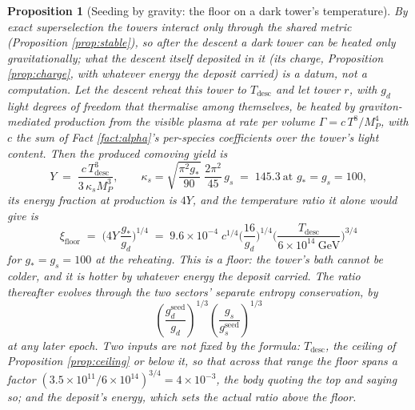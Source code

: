 \documentclass[11pt]{article}
\newtheorem{proposition}[theorem]{Proposition}
\theoremstyle{definition}
\begin{document}
\begin{proposition}[Seeding by gravity: the floor on a dark tower's temperature]\label{prop:gravseed}
By exact superselection the towers interact only through the shared metric (Proposition \ref{prop:stable}), so after the descent a dark tower can be heated only gravitationally; what the descent itself deposited in it (its charge, Proposition \ref{prop:charge}, with whatever energy the deposit carried) is a datum, not a computation. Let the descent reheat this tower to $T_{\mathrm{desc}}$ and let tower $r$, with $g_{d}$ light degrees of freedom that thermalise among themselves, be heated by graviton-mediated production from the visible plasma at rate per volume $\Gamma = c\,T^{8}/M_{P}^{4}$, with $c$ the sum of Fact \ref{fact:alpha}'s per-species coefficients over the tower's light content. Then the produced comoving yield is
\[
Y \;=\; \frac{c\,T_{\mathrm{desc}}^{3}}{3\,\kappa_{s}M_{P}^{3}}, \qquad \kappa_{s} = \sqrt{\frac{\pi^{2}g_{*}}{90}}\;\frac{2\pi^{2}}{45}\,g_{s} \;=\; 145.3 \ \text{at } g_{*} = g_{s} = 100,
\]
its energy fraction at production is $4Y$, and the temperature ratio it alone would give is
\[
\xi_{\mathrm{floor}} \;=\; \Big(4Y\,\frac{g_{*}}{g_{d}}\Big)^{1/4} \;=\; 9.6 \times 10^{-4}\; c^{1/4}\Big(\frac{16}{g_{d}}\Big)^{1/4}\Big(\frac{T_{\mathrm{desc}}}{6 \times 10^{14}\ \mathrm{GeV}}\Big)^{3/4}
\]
for $g_{*} = g_{s} = 100$ at the reheating. This is a floor: the tower's bath cannot be colder, and it is hotter by whatever energy the deposit carried. The ratio thereafter evolves through the two sectors' separate entropy conservation, by
\[
\left(\frac{g_{d}^{\mathrm{seed}}}{g_{d}}\right)^{1/3}\left(\frac{g_{s}}{g_{s}^{\mathrm{seed}}}\right)^{1/3}
\]
at any later epoch. Two inputs are not fixed by the formula: $T_{\mathrm{desc}}$, the ceiling of Proposition \ref{prop:ceiling} or below it, so that across that range the floor spans a factor $(3.5 \times 10^{11}/6 \times 10^{14})^{3/4} = 4 \times 10^{-3}$, the body quoting the top and saying so; and the deposit's energy, which sets the actual ratio above the floor.
\end{proposition}
\end{document}
